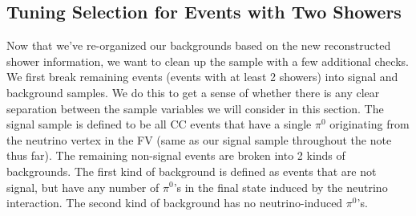 \documentclass{article}
\begin{document}



\subsection{Tuning Selection for Events with Two Showers}
Now that we've re-organized our backgrounds based on the new reconstructed shower information, we want to clean up the sample with a few additional checks.  We first break remaining events (events with at least 2 showers) into signal and background samples. We do this to get a sense of whether there is any clear separation between the sample variables we will consider in this section. The signal sample is defined to be all CC events that have a single $\pi^0$ originating from the neutrino vertex in the FV (same as our signal sample throughout the note thus far).  The remaining non-signal events are broken into 2 kinds of backgrounds.  The first kind of background is defined as events that are not signal, but have any number of $\pi^0$'s in the final state induced by the neutrino interaction. The second kind of background has no neutrino-induced $\pi^0$'s. 
\end{document}
